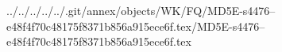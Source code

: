 ../../../../../.git/annex/objects/WK/FQ/MD5E-s4476--e48f4f70c48175f8371b856a915ece6f.tex/MD5E-s4476--e48f4f70c48175f8371b856a915ece6f.tex